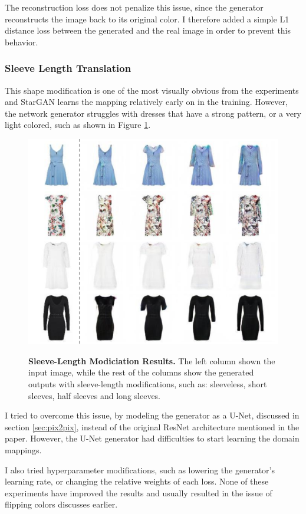 \documentclass[12pt]{report}
\begin{document}
The reconstruction loss does not penalize this issue, since the generator reconstructs the image back to its original color. I therefore added a simple L1 distance loss between the generated and the real image in order to prevent this behavior.

\pagebreak
\subsubsection{Sleeve Length Translation}
This shape modification is one of the most visually obvious from the experiments and StarGAN learns the mapping relatively early on in the training. However, the network generator struggles with dresses that have a strong pattern, or a very light colored, such as shown in Figure \ref{fig:sleeves_results}.

\begin{figure}[h]
\centering
{\includegraphics[width=.7\linewidth]{04_experiments/stargan/sleeve_results}}
\caption{\label{fig:sleeves_results} \textbf{Sleeve-Length Modiciation Results.} The left column shown the input image, while the rest of the columns show the generated outputs with sleeve-length modifications, such as: sleeveless, short sleeves, half sleeves and long sleeves.}
\end{figure}

I tried to overcome this issue, by modeling the generator as a U-Net, discussed in section \ref{sec:pix2pix}, instead of the original ResNet architecture mentioned in the paper. However, the U-Net generator had difficulties to start learning the domain mappings.

I also tried hyperparameter modifications, such as lowering the generator's learning rate, or changing the relative weights of each loss. None of these experiments have improved the results and usually resulted in the issue of flipping colors discusses earlier.
\end{document}

